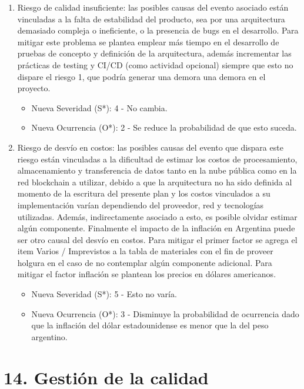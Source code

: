 \documentclass[
11pt, %
]{charter}
\begin{document}
\begin{enumerate}
	
	\item Riesgo de calidad insuficiente: las posibles causas del evento asociado están vinculadas a la falta de estabilidad del producto, sea por una arquitectura demasiado compleja o ineficiente, o la presencia de bugs en el desarrollo. Para mitigar este problema se plantea emplear más tiempo en el desarrollo de pruebas de concepto y definición de la arquitectura, además incrementar las prácticas de testing y CI/CD (como actividad opcional) siempre que esto no dispare el riesgo 1, que podría generar una demora una demora en el proyecto.
	\begin{itemize}
		\item Nueva Severidad (S*): 4 - No cambia.
		\item Nueva Ocurrencia (O*): 2 - Se reduce la probabilidad de que esto suceda.
	\end{itemize}	
	
	\item Riesgo de desvío en costos: las posibles causas del evento que dispara este riesgo están vinculadas a la dificultad de estimar los costos de procesamiento, almacenamiento y transferencia de datos tanto en la nube pública como en la red blockchain a utilizar, debido a que la arquitectura no ha sido definida al momento de la escritura del presente plan y los costos vinculados a su implementación varían dependiendo del proveedor, red y tecnologías utilizadas. Además, indirectamente asociado a esto, es posible olvidar estimar algún componente. Finalmente el impacto de la inflación en Argentina puede ser otro causal del desvío en costos. Para mitigar el primer factor se agrega el item Varios / Imprevistos a la tabla de materiales con el fin de proveer holgura en el caso de no contemplar algún componente adicional. Para mitigar el factor inflación se plantean los precios en dólares americanos.
	\begin{itemize}
		\item Nueva Severidad (S*): 5 - Esto no varía.
		\item Nueva Ocurrencia (O*): 3 - Disminuye la probabilidad de ocurrencia dado que la inflación del dólar estadounidense es menor que la del peso argentino.
	\end{itemize}
\end{enumerate}




\section{14. Gestión de la calidad}
\label{sec:calidad}
\end{document}
